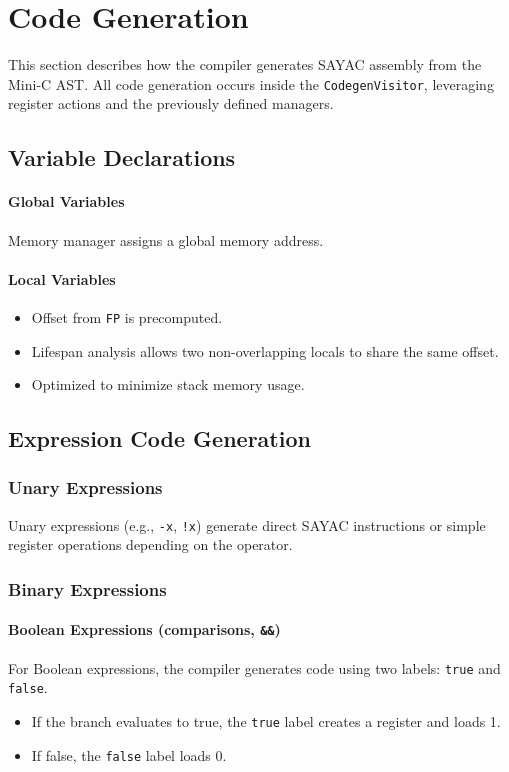 \documentclass[12pt,a4paper]{report}
\begin{document}
\section{Code Generation}
\label{sec:codegen}

This section describes how the compiler generates SAYAC assembly from the Mini-C AST.  
All code generation occurs inside the \texttt{CodegenVisitor}, leveraging register actions and the previously defined managers.
\subsection{Variable Declarations}
\paragraph{Global Variables}  
Memory manager assigns a global memory address.

\paragraph{Local Variables}  
\begin{itemize}
    \item Offset from \texttt{FP} is precomputed.  
    \item Lifespan analysis allows two non-overlapping locals to share the same offset.  
    \item Optimized to minimize stack memory usage.
\end{itemize}

\subsection{Expression Code Generation}

\subsubsection{Unary Expressions}
Unary expressions (e.g., \texttt{-x}, \texttt{!x}) generate direct SAYAC instructions or simple register operations depending on the operator.

\subsubsection{Binary Expressions}
\paragraph{Boolean Expressions (comparisons, \texttt{\&\&})}  
  For Boolean expressions, the compiler generates code using two labels: \texttt{true} and \texttt{false}.  
\begin{itemize}
    \item If the branch evaluates to true, the \texttt{true} label creates a register and loads 1.  
    \item If false, the \texttt{false} label loads 0.
\end{itemize}
\end{document}
